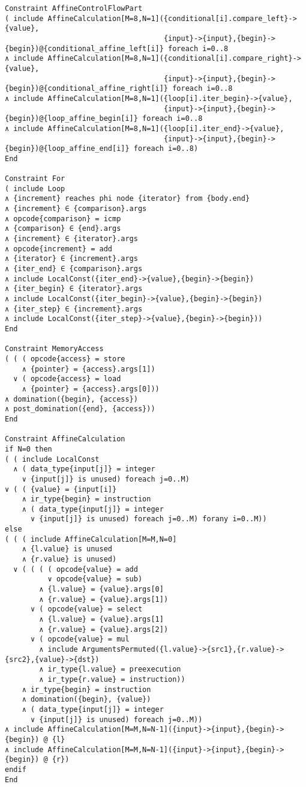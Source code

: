 \begin{lstlisting}[language=CAnDL]
Constraint AffineControlFlowPart
( include AffineCalculation[M=8,N=1]({conditional[i].compare_left}->{value},
                                     {input}->{input},{begin}->{begin})@{conditional_affine_left[i]} foreach i=0..8
∧ include AffineCalculation[M=8,N=1]({conditional[i].compare_right}->{value},
                                     {input}->{input},{begin}->{begin})@{conditional_affine_right[i]} foreach i=0..8
∧ include AffineCalculation[M=8,N=1]({loop[i].iter_begin}->{value},
                                     {input}->{input},{begin}->{begin})@{loop_affine_begin[i]} foreach i=0..8
∧ include AffineCalculation[M=8,N=1]({loop[i].iter_end}->{value},
                                     {input}->{input},{begin}->{begin})@{loop_affine_end[i]} foreach i=0..8)
End

Constraint For
( include Loop
∧ {increment} reaches phi node {iterator} from {body.end}
∧ {increment} ∈ {comparison}.args
∧ opcode{comparison} = icmp
∧ {comparison} ∈ {end}.args
∧ {increment} ∈ {iterator}.args
∧ opcode{increment} = add
∧ {iterator} ∈ {increment}.args
∧ {iter_end} ∈ {comparison}.args
∧ include LocalConst({iter_end}->{value},{begin}->{begin})
∧ {iter_begin} ∈ {iterator}.args
∧ include LocalConst({iter_begin}->{value},{begin}->{begin})
∧ {iter_step} ∈ {increment}.args
∧ include LocalConst({iter_step}->{value},{begin}->{begin}))
End

Constraint MemoryAccess
( ( ( opcode{access} = store
    ∧ {pointer} = {access}.args[1])
  ∨ ( opcode{access} = load
    ∧ {pointer} = {access}.args[0]))
∧ domination({begin}, {access})
∧ post_domination({end}, {access}))
End

Constraint AffineCalculation
if N=0 then
( ( include LocalConst
  ∧ ( data_type{input[j]} = integer
    ∨ {input[j]} is unused) foreach j=0..M)
∨ ( ( {value} = {input[i]}
    ∧ ir_type{begin} = instruction
    ∧ ( data_type{input[j]} = integer
      ∨ {input[j]} is unused) foreach j=0..M) forany i=0..M))
else
( ( ( include AffineCalculation[M=M,N=0]
    ∧ {l.value} is unused
    ∧ {r.value} is unused)
  ∨ ( ( ( ( opcode{value} = add
          ∨ opcode{value} = sub)
        ∧ {l.value} = {value}.args[0]
        ∧ {r.value} = {value}.args[1])
      ∨ ( opcode{value} = select
        ∧ {l.value} = {value}.args[1]
        ∧ {r.value} = {value}.args[2])
      ∨ ( opcode{value} = mul
        ∧ include ArgumentsPermuted({l.value}->{src1},{r.value}->{src2},{value}->{dst})
        ∧ ir_type{l.value} = preexecution
        ∧ ir_type{r.value} = instruction))
    ∧ ir_type{begin} = instruction
    ∧ domination({begin}, {value})
    ∧ ( data_type{input[j]} = integer
      ∨ {input[j]} is unused) foreach j=0..M))
∧ include AffineCalculation[M=M,N=N-1]({input}->{input},{begin}->{begin}) @ {l}
∧ include AffineCalculation[M=M,N=N-1]({input}->{input},{begin}->{begin}) @ {r})
endif
End


\end{lstlisting}
